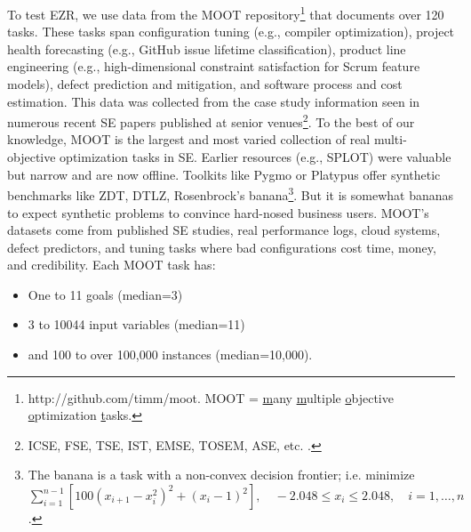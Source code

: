 \documentclass[AMA,STIX2COL]{WileyNJDv5}
\begin{document}
To  test EZR, we use data from the  MOOT repository\footnote{http://github.com/timm/moot.
MOOT = \underline{m}any \underline{m}ultiple \underline{o}bjective
\underline{o}ptimization \underline{t}asks.} that  documents
over 120 tasks. These tasks span configuration tuning (e.g., compiler optimization),
project health forecasting (e.g., GitHub issue lifetime classification), product
line engineering (e.g., high-dimensional constraint satisfaction for Scrum
feature models), defect prediction and mitigation, and software process and cost
estimation. This data   was collected from the case study information seen in numerous recent SE papers published at senior venues\footnote{
ICSE, FSE, TSE, IST, EMSE, TOSEM, ASE, etc. \cite{chen2026promisetune, DBLP:conf/icse/WeberKSAS23,10172849,DBLP:conf/icse/HaZ19,nair2017using,DBLP:conf/sigsoft/JamshidiVKS18,chen2025accuracy,xia2020sequential,krishna2020whence,Chen19, krall2015gale,chen2018beyond,fu2016tuning,hulse2025shaky, peng2023veer,guo2018data,lustosa2024learning,nair2018faster}.}.
 To the best of our knowledge, MOOT is the largest and most varied
collection of real multi-objective optimization tasks in SE. Earlier
resources (e.g., SPLOT) were valuable but narrow and are now offline.
Toolkits like Pygmo or Platypus offer synthetic benchmarks like ZDT,
DTLZ, Rosenbrock's banana\footnote{
The banana is a task with a non-convex decision frontier; i.e.
minimize $\sum_{i=1}^{n-1} \left[ 100(x_{i+1} - x_i^2)^2 + (x_i - 1)^2
\right], \quad -2.048 \leq x_i \leq 2.048, \quad i = 1, \ldots, n$.
}. But it is somewhat bananas to expect synthetic problems to convince
hard-nosed business users. MOOT's datasets come from published SE
studies, real performance logs, cloud systems, defect predictors, and
tuning tasks where bad configurations cost time, money, and
credibility.
Each MOOT  task has:
\begin{itemize}
\item
One to 11 goals (median=3)
\item
3 to 10044 input variables (median=11) 
\item and   100 to over 100,000 instances (median=10,000).  
\end{itemize}

 



 
\end{document}
